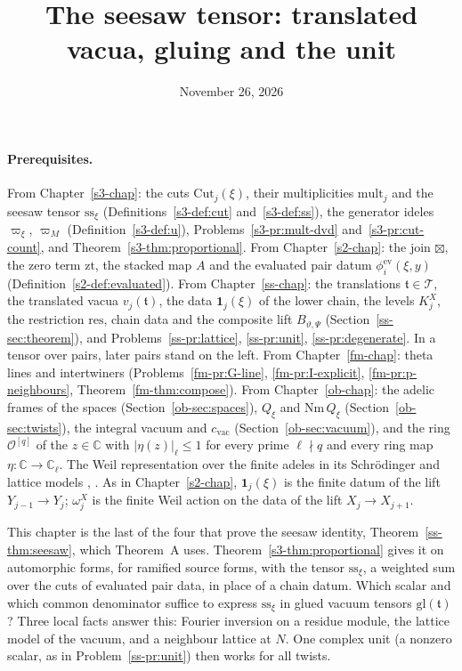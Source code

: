 \documentclass[reqno]{amsart}
\title{The seesaw tensor: translated vacua, gluing and the unit}
\author{}
\date{November 26, 2026}
\newcounter{chap}
\theoremstyle{definition}
\theoremstyle{plain}
\newcommand{\C}{\mathbb{C}}
\newcommand{\Oc}{\mathcal{O}}
\newcommand{\Tc}{\mathcal{T}}
\newcommand{\Nm}{\mathrm{Nm}\,}
\newcommand{\zt}{\mathrm{zt}}
\newcommand{\gl}{\mathrm{gl}}
\newcommand{\res}{\mathrm{res}}
\newcommand{\ssx}{\mathrm{ss}_\xi}
\newcommand{\Cut}{\mathrm{Cut}}
\newcommand{\mult}{\mathrm{mult}}
\newcommand{\ev}{\phi^{\mathrm{ev}}}
\newcommand{\cvac}{c_{\mathrm{vac}}}
\begin{document}
\maketitle
{}\label{chap}

\paragraph{Prerequisites.}
From Chapter~\ref{s3-chap}: the cuts \(\Cut_j(\xi)\), their multiplicities \(\mult_j\) and the seesaw tensor \(\ssx\) (Definitions~\ref{s3-def:cut} and~\ref{s3-def:ss}), the generator ideles \(\varpi_\xi\), \(\varpi_M\) (Definition~\ref{s3-def:u}), Problems~\ref{s3-pr:mult-dvd} and~\ref{s3-pr:cut-count}, and Theorem~\ref{s3-thm:proportional}.  From Chapter~\ref{s2-chap}: the join \(\boxtimes\), the zero term \(\zt\), the stacked map \(A\) and the evaluated pair datum \(\ev_i(\xi,y)\) (Definition~\ref{s2-def:evaluated}).  From Chapter~\ref{ss-chap}: the translations \(\mathfrak t\in\Tc\), the translated vacua \(v_j(\mathfrak t)\), the data \(\mathbf 1_j(\xi)\) of the lower chain, the levels \(K^X_j\), the restriction \(\res\), chain data and the composite lift \(B_{\vartheta,\Psi}\) (Section~\ref{ss-sec:theorem}), and Problems~\ref{ss-pr:lattice}, \ref{ss-pr:unit}, \ref{ss-pr:degenerate}.  In a tensor over pairs, later pairs stand on the left.  From Chapter~\ref{fm-chap}: theta lines and intertwiners (Problems~\ref{fm-pr:G-line}, \ref{fm-pr:I-explicit}, \ref{fm-pr:p-neighbours}, Theorem~\ref{fm-thm:compose}).  From Chapter~\ref{ob-chap}: the adelic frames of the spaces (Section~\ref{ob-sec:spaces}), \(Q_\xi\) and \(\Nm Q_\xi\) (Section~\ref{ob-sec:twists}), the integral vacuum and \(\cvac\) (Section~\ref{ob-sec:vacuum}), and the ring \(\Oc^{[q]}\) of the \(z\in\C\) with \(\lvert\eta(z)\rvert_\ell\le1\) for every prime \(\ell\nmid q\) and every ring map \(\eta\colon\C\to\C_\ell\).  The Weil representation over the finite adeles in its Schr\"odinger and lattice models \cite{We}, \cite[Ch.~2]{MVW}.  As in Chapter~\ref{s2-chap}, \(\mathbf 1_j(\xi)\) is the finite datum of the lift \(Y_{j-1}\to Y_j\); \(\omega^X_j\) is the finite Weil action on the data of the lift \(X_j\to X_{j+1}\).

\medskip
This chapter is the last of the four that prove the seesaw identity, Theorem~\ref{ss-thm:seesaw}, which Theorem~A uses.  Theorem~\ref{s3-thm:proportional} gives it on automorphic forms, for ramified source forms, with the tensor \(\ssx\), a weighted sum over the cuts of evaluated pair data, in place of a chain datum.  Which scalar and which common denominator suffice to express \(\ssx\) in glued vacuum tensors \(\gl(\mathfrak t)\)?  Three local facts answer this: Fourier inversion on a residue module, the lattice model of the vacuum, and a neighbour lattice at \(N\).  One complex unit (a nonzero scalar, as in Problem~\ref{ss-pr:unit}) then works for all twists.
\end{document}
